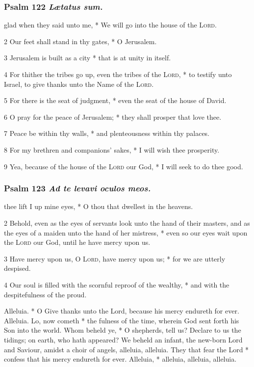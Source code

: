 \subsubsection{Psalm 122 \textit{L{\ae}tatus sum.}}
 glad when they said unto me, * We will go into the house of the \textsc{Lord}.
\par
    2 Our feet shall stand in thy gates, * O Jerusalem.
\par
    3 Jerusalem is built as a city * that is at unity in itself.
\par
    4 For thither the tribes go up, even the tribes of the \textsc{Lord}, * to testify unto Israel, to give thanks unto the Name of the \textsc{Lord}.
\par
    5 For there is the seat of judgment, * even the seat of the house of David.
\par
    6 O pray for the peace of Jerusalem; * they shall prosper that love thee.
\par
    7 Peace be within thy walls, * and plenteousness within thy palaces.
\par
    8 For my brethren and companions' sakes, * I will wish thee prosperity.
\par
    9 Yea, because of the house of the \textsc{Lord} our God, * I will seek to do thee good.
\subsubsection{Psalm 123 \textit{Ad te levavi oculos meos.}}
 thee lift I up mine eyes, * O thou that dwellest in the heavens.
\par
    2 Behold, even as the eyes of servants look unto the hand of their masters, and as the eyes of a maiden unto the hand of her mistress, * even so our eyes wait upon the \textsc{Lord} our God, until he have mercy upon us.
\par
    3 Have mercy upon us, O \textsc{Lord}, have mercy upon us; * for we are utterly despised.
\par
    4 Our soul is filled with the scornful reproof of the wealthy, * and with the despitefulness of the proud.
\par\noindent
{} Alleluia. * O Give thanks unto the Lord, because his mercy endureth for ever. Alleluia.
 Lo, now cometh * the fulness of the time, wherein God sent forth his Son into the world.
 Whom beheld ye, * O shepherds, tell us? Declare to us the tidings; on earth, who hath appeared? We beheld an infant, the new-born Lord and Saviour, amidst a choir of angels, alleluia, alleluia.
 They that fear the Lord * confess that his mercy endureth for ever.
 Alleluia, * alleluia, alleluia, alleluia.
